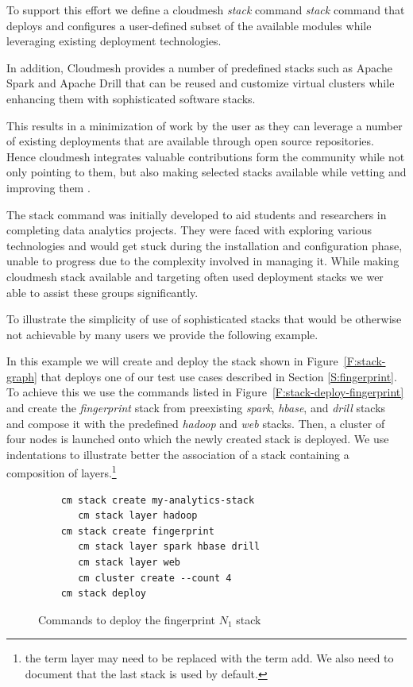 To support this effort we define a cloudmesh {\em stack} command {\it
  stack} command that deploys and configures a user-defined subset of
the available modules while leveraging existing deployment
technologies.

In addition, Cloudmesh provides a number of predefined stacks such as
Apache Spark and Apache Drill that can be reused and customize virtual
clusters while enhancing them with sophisticated software stacks. 

This results in a minimization of work by the user as
they can leverage a number of existing deployments that are
available through open source repositories. Hence cloudmesh integrates
valuable contributions form the community while not only pointing to
them, but also making selected stacks available while vetting and
improving them \cite{www-cm-stacks}.


The stack command was initially developed to aid students and
researchers in completing data analytics projects.  They were faced
with exploring various technologies and would get stuck during the
installation and configuration phase, unable to progress due to the
complexity involved in managing it. While making cloudmesh stack
available and targeting often used deployment stacks we wer able to
assist these groups significantly.  

To illustrate the simplicity of use of sophisticated stacks that would
be otherwise not achievable by many users we provide the following example.

In this example we will create and deploy the stack shown in
Figure~\ref{F:stack-graph} that deploys one of our test use cases
described in Section \ref{S:fingerprint}. To achieve this we use the
commands listed in Figure~\ref{F:stack-deploy-fingerprint} and create
the {\it fingerprint} stack from preexisting {\it spark}, {\it hbase},
and {\it drill} stacks and compose it with the predefined {\it hadoop}
and {\it web} stacks. Then, a cluster of four nodes is launched onto
which the newly created stack is deployed. We use indentations to
illustrate better the association of a stack containing a composition
of layers.\footnote{the term layer may need to be replaced with the
  term add. We also need to document that the last stack is used by default.}

\begin{figure}[htb]
\begin{Verbatim}
    cm stack create my-analytics-stack
       cm stack layer hadoop
    cm stack create fingerprint
       cm stack layer spark hbase drill
       cm stack layer web
       cm cluster create --count 4
    cm stack deploy
\end{Verbatim}
\vspace{-12pt}
\caption{Commands to deploy the fingerprint $N_1$ stack}
\end{figure}


